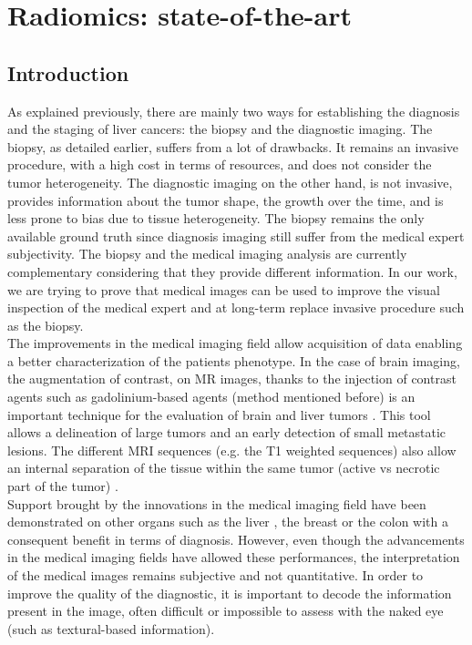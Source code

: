 
\chapter{Radiomics: state-of-the-art}\label{radiomics}

\section{Introduction}\label{introduction}

As explained previously, there are mainly two ways for establishing the diagnosis and the staging of liver cancers: the biopsy and the
diagnostic imaging. The biopsy, as detailed earlier, suffers from a lot of drawbacks. It
remains an invasive procedure, with a high cost in terms of resources,
and does not consider the tumor heterogeneity. The diagnostic imaging on the other hand, is not invasive, provides
information about the tumor shape, the growth over the time, and is less
prone to bias due to tissue heterogeneity.
The biopsy remains the only available ground truth since diagnosis imaging still suffer from the medical expert subjectivity. The biopsy and the medical imaging analysis are currently complementary considering that they provide different information. In our work, we are trying to prove that medical images can be used to improve the visual inspection of the medical expert and at long-term replace invasive procedure such as the biopsy.\\
The improvements in the medical imaging field allow acquisition
of data enabling a better characterization of the patients phenotype. In the case of brain imaging, the augmentation of contrast, on MR
images, thanks to the injection of contrast agents such as
gadolinium-based agents (method mentioned before) is an important
technique for the evaluation of brain and liver tumors \cite{Drevelegas2011,Zhou2014,Thian2013}. This tool allows a delineation of large tumors and an
early detection of small metastatic lesions. The different MRI sequences
(e.g. the T1 weighted sequences) also allow an internal separation of
the tissue within the same tumor (active vs necrotic part of the tumor)
\cite{Drevelegas2011}. \\
Support brought by the innovations in the medical imaging field have
been demonstrated on other organs such as the liver \cite{Davnall2012}, the breast \cite{Koolen2012} or the colon
\cite{Sahani2014} with a consequent benefit in terms of
diagnosis. However, even though the advancements in the medical imaging fields have
allowed these performances, the interpretation of the medical images
remains subjective and not quantitative. In order to improve the quality of the diagnostic, it is important to decode the information present in the image, often difficult or impossible to assess with the naked eye (such as textural-based information).

